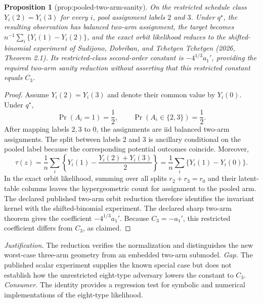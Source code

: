 \documentclass{article}
\newtheorem{proposition}{Proposition}
\begin{document}
\begin{proposition}[prop:pooled-two-arm-sanity]\label{prop:pooled-two-arm-sanity}
On the restricted schedule class \(Y_i(2)=Y_i(3)\) for every \(i\), pool assignment labels \(2\) and \(3\). Under \(q^\star\), the resulting observation has balanced two-arm assignment, the target becomes \(n^{-1}\sum_i\{Y_i(1)-Y_i(2)\}\), and the exact orbit likelihood reduces to the shifted-binomial experiment of Sudijono, Dobriban, and Tchetgen Tchetgen (2026, Theorem 2.1). Its restricted-class second-order constant is \(-4^{1/3}a_1'\), providing the required two-arm sanity reduction without asserting that this restricted constant equals \(C_3\).
\end{proposition}
\begin{proof}
Assume \(Y_i(2)=Y_i(3)\) and denote their common value by \(Y_i(0)\).  Under \(q^\star\),
\[
\Pr(A_i=1)=\frac12,
\qquad
\Pr(A_i\in\{2,3\})=\frac12.
\]
After mapping labels \(2,3\) to \(0\), the assignments are iid balanced two-arm assignments.  The split between labels \(2\) and \(3\) is ancillary conditional on the pooled label because the corresponding potential outcomes coincide.  Moreover,
\[
\tau(z)=\frac1n\sum_i\left\{Y_i(1)-\frac{Y_i(2)+Y_i(3)}2\right\}
=\frac1n\sum_i\{Y_i(1)-Y_i(0)\}.
\]
In the exact orbit likelihood, summing over all splits \(r_2+r_3=r_0\) and their latent-table columns leaves the hypergeometric count for assignment to the pooled arm.  The declared published two-arm orbit reduction therefore identifies the invariant kernel with the shifted-binomial experiment.  The declared sharp two-arm theorem gives the coefficient \(-4^{1/3}a_1'\).  Because \(C_3=-a_1'\), this restricted coefficient differs from \(C_3\), as claimed.
\end{proof}
\par\smallskip\noindent \textit{Justification.} The reduction verifies the normalization and distinguishes the new worst-case three-arm geometry from an embedded two-arm submodel. \textit{Gap.} The published scalar experiment supplies the known special case but does not establish how the unrestricted eight-type adversary lowers the constant to \(C_3\). \textit{Consumer.} The identity provides a regression test for symbolic and numerical implementations of the eight-type likelihood.
\end{document}
